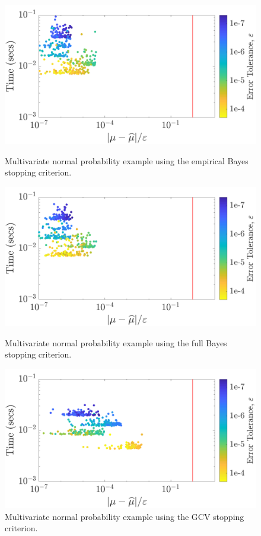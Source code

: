 \documentclass[twocolumn]{svjour3}          %
\begin{document}
\begin{figure}
	\centering
	\includegraphics[width=0.98\linewidth]{"Lattice_MVN_guaranteed_time_MLE_C2sin_d2_r2_2019-Jun-27"}
	\caption[Guaranteed:]{Multivariate normal probability example using the empirical Bayes stopping criterion.}
	\label{fig:mvn-guaranteed-MLE}
	\centering
	\includegraphics[width=0.98\linewidth]{"Lattice_MVN_guaranteed_time_full_C2sin_d2_r2_2019-Jun-27"}
	\caption[MVN guaranteed : FB]{Multivariate normal probability example using the full Bayes stopping criterion.}
	\label{fig:mvn-guaranteed-FB}
	\centering
	\includegraphics[width=0.98\linewidth]{"Lattice_MVN_guaranteed_time_GCV_C2sin_d2_r2_2019-Jun-27"}
	\caption[MVN guaranteed : GCV]{Multivariate normal probability example using the GCV stopping criterion.}
	\label{fig:mvn-guaranteed-GCV}
\end{figure}
\end{document}
